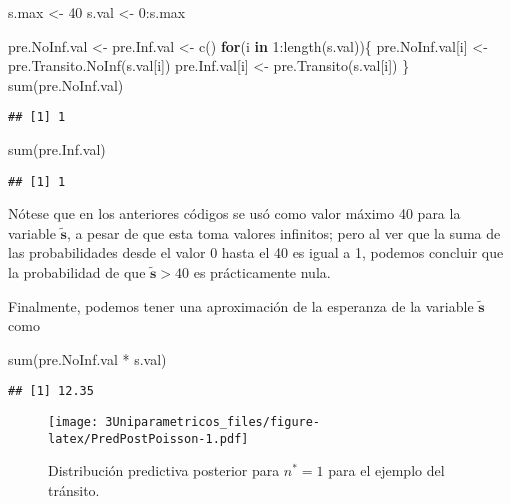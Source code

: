 \documentclass[
  12pt,
  spanish,
]{book}
\newenvironment{Shaded}{\begin{snugshade}}{\end{snugshade}}
\newcommand{\ControlFlowTok}[1]{\textcolor[rgb]{0.13,0.29,0.53}{\textbf{#1}}}
\newcommand{\DecValTok}[1]{\textcolor[rgb]{0.00,0.00,0.81}{#1}}
\newcommand{\FunctionTok}[1]{\textcolor[rgb]{0.00,0.00,0.00}{#1}}
\newcommand{\NormalTok}[1]{#1}
\newcommand{\OtherTok}[1]{\textcolor[rgb]{0.56,0.35,0.01}{#1}}
\newcommand{\SpecialCharTok}[1]{\textcolor[rgb]{0.00,0.00,0.00}{#1}}
\theoremstyle{definition}
\theoremstyle{definition}
\theoremstyle{definition}
\theoremstyle{definition}
\theoremstyle{remark}
\begin{document}
\begin{Shaded}
\begin{Highlighting}[]
\NormalTok{s.max }\OtherTok{\textless{}{-}} \DecValTok{40} 
\NormalTok{s.val }\OtherTok{\textless{}{-}} \DecValTok{0}\SpecialCharTok{:}\NormalTok{s.max}

\NormalTok{pre.NoInf.val }\OtherTok{\textless{}{-}}\NormalTok{ pre.Inf.val }\OtherTok{\textless{}{-}} \FunctionTok{c}\NormalTok{()}
\ControlFlowTok{for}\NormalTok{(i }\ControlFlowTok{in} \DecValTok{1}\SpecialCharTok{:}\FunctionTok{length}\NormalTok{(s.val))\{}
\NormalTok{  pre.NoInf.val[i] }\OtherTok{\textless{}{-}} \FunctionTok{pre.Transito.NoInf}\NormalTok{(s.val[i])}
\NormalTok{  pre.Inf.val[i] }\OtherTok{\textless{}{-}} \FunctionTok{pre.Transito}\NormalTok{(s.val[i])}
\NormalTok{\}}
\FunctionTok{sum}\NormalTok{(pre.NoInf.val)}
\end{Highlighting}
\end{Shaded}

\begin{verbatim}
## [1] 1
\end{verbatim}

\begin{Shaded}
\begin{Highlighting}[]
\FunctionTok{sum}\NormalTok{(pre.Inf.val)}
\end{Highlighting}
\end{Shaded}

\begin{verbatim}
## [1] 1
\end{verbatim}

Nótese que en los anteriores códigos se usó como valor máximo 40 para la variable \(\mathbf{\tilde{s}}\), a pesar de que esta toma valores infinitos; pero al ver que la suma de las probabilidades desde el valor 0 hasta el 40 es igual a 1, podemos concluir que la probabilidad de que \(\mathbf{\tilde{s}} > 40\) es prácticamente nula.

Finalmente, podemos tener una aproximación de la esperanza de la variable \(\mathbf{\tilde{s}}\) como

\begin{Shaded}
\begin{Highlighting}[]
\FunctionTok{sum}\NormalTok{(pre.NoInf.val }\SpecialCharTok{*}\NormalTok{ s.val)}
\end{Highlighting}
\end{Shaded}

\begin{verbatim}
## [1] 12.35
\end{verbatim}

\begin{figure}
\centering
\texttt{[image: 3Uniparametricos\_files/figure-latex/PredPostPoisson-1.pdf]}
\caption{\label{fig:PredPostPoisson}Distribución predictiva posterior para \(n^*=1\) para el ejemplo del tránsito.}
\end{figure}
\end{document}
